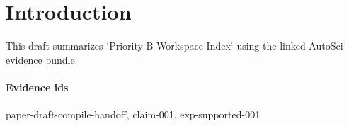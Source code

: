\section{Introduction}
This draft summarizes `Priority B Workspace Index` using the linked AutoSci evidence bundle.

\paragraph{Evidence ids} paper-draft-compile-handoff, claim-001, exp-supported-001
